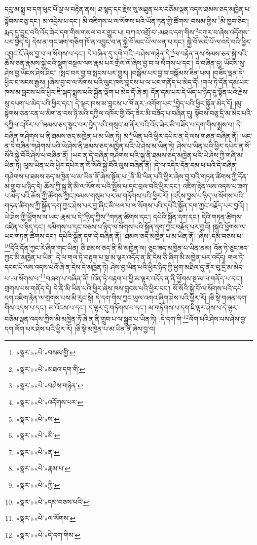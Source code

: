 དབུ་མ་སྨྲ་བ་དག་ཕུང་པོ་ལྔ་ལ་བརྟེན་ནས། ཐ་སྙད་དང་རྗེས་སུ་མཐུན་པར་བཅོམ་ལྡན་འདས་ཐམས་ཅད་མཁྱེན་པ་སྟོབས་བཅུ་དང་། མ་འདྲེས་པ་དང་། མི་འཇིགས་པ་ལ་སོགས་པའི་ཡོན་ཏན་གྱི་ཚོགས་:བསམ་གྱིས་\footnote{«སྣར་»«པེ་»བསམ་གྱི་}མི་ཁྱབ་ཅིང་། རྨད་དུ་བྱུང་བའི་འོད་ཟེར་དག་གིས་གསལ་བར་གྱུར་པ། བཀའ་འགྲོ་བ་:མཐའ་དག་གིས་\footnote{«སྣར་»«པེ་»མཐའ་དག་གི་}བཀུར་བ་ཞེས་འདོགས་པར་བྱེད་དེ། དེས་ན་གང་ཟག་གཅིག་ཁོ་ན་འབྱུང་བ་ན་སྐྱེ་བོ་མང་པོ་ལ་ཕན་པ་དང་། སྐྱེ་བོ་མང་པོ་ལ་བདེ་བའི་ཕྱིར་འབྱུང་ངོ་ཞེས་བྱ་བ་ལ་སོགས་པ་དང་། དེ་བཞིན་དུ་དགེ་བའི་:བཤེས་གཉེན་དེ་\footnote{«སྣར་»«པེ་»བཤེས་གཉེན་}ལ་བརྟེན་ནས་སེམས་ཅན་སྐྱེ་བའི་ཆོས་ཅན་རྣམས་སྐྱེ་བའི་སྡུག་བསྔལ་ལས་རྣམ་པར་གྲོལ་ལོ་ཞེས་བྱ་བ་ལ་སོགས་པ་དང་། དེ་བཞིན་དུ། ཡོངས་སུ་ཤེས་བྱ་ཡོངས་ཤེས་ཤིང་། །སྤང་བར་བྱ་བ་སྤངས་པར་གྱུར། །བསྒོམ་པར་བྱ་བ་བསྒོམས་ཟིན་པས། །བཟོད་ལྡན་དེ་ཕྱིར་ང་སངས་རྒྱས། །ཞེས་བྱ་བ་ལ་སོགས་པའི་ལུང་ཁས་བླངས་པ་ལ་ཡང་གནོད་པ་མེད་དོ། །གལ་ཏེ་དོན་དམ་པར་ཁས་མ་བླངས་པའི་ཕྱིར་ཇི་སྐད་སྨྲས་པའི་སྐྱོན་ལྡོག་པ་མེད་དོ་ཞེ་ན། དོན་དམ་པར་དེ་ཡོད་པ་ཉིད་དུ་སྟོན་པའི་རྗེས་སུ་དཔག་པ་མེད་པའི་ཕྱིར་དང་། དེ་ལྟར་ཁས་མ་བླངས་པ་ཁོ་ནར་:འགོག་པར་\footnote{«སྣར་»«པེ་»འདོགས་པར་}བྱེད་པའི་ཕྱིར་སྐྱོན་མེད་དོ། །མུ་སྟེགས་ཅན་ངན་པ་མིག་ན་བས་ཉི་མའི་དཀྱིལ་འཁོར་གྱི་འོད་ཟེར་མི་བཟོད་པ་བཞིན་དུ། སྟོབས་བཅུ་དྲི་མ་མེད་པའི་དཀྱིལ་འཁོར་པ་\footnote{«སྣར་»«པེ་»ས་}ཐམས་ཅད་སྣང་བར་བྱེད་པའི་གསུང་མ་ནོར་བའི་འོད་ཟེར་མི་བཟོད་པ་དག་གིས་སྨྲས་པ། དེ་བཞིན་གཤེགས་པ་ནི་ཐམས་ཅད་མཁྱེན་པ་མ་ཡིན་ཏེ། མ་\footnote{«སྣར་»«པེ་»མི་}ཡིན་པའི་ཕྱིར་དཔེར་ན་དེ་ལས་གཞན་བཞིན་ནོ། །ཡང་ན་དེ་བཞིན་གཤེགས་པའི་ཡེ་ཤེས་ནི་ཐམས་ཅད་མཁྱེན་པའི་ཡེ་ཤེས་མ་ཡིན་ཏེ། ཤེས་པ་ཡིན་པའི་ཕྱིར་དཔེར་ན་སོ་སོའི་སྐྱེ་བོའི་ཤེས་པ་བཞིན་ནོ། །ཡང་ན་དེ་བཞིན་གཤེགས་པའི་སྐུ་ནི་ཐམས་ཅད་མཁྱེན་པའི་ཡེ་ཤེས་ཀྱི་གཞི་མ་ཡིན་ཏེ། ལུས་ཡིན་པའི་ཕྱིར་དཔེར་ན་སོ་སོའི་སྐྱེ་བོའི་ལུས་བཞིན་ནོ། །དེ་ལ་འདིར་དོན་དམ་པ་པའི་དེ་བཞིན་གཤེགས་པ་ཐམས་ཅད་མཁྱེན་པ་མ་ཡིན་ནོ་ཞེས་སྟོན་པ་\footnote{«སྣར་»«པེ་»ན་}ནི་མི་ཡིན་པའི་ཕྱིར་ཞེས་བྱ་བའི་གཏན་ཚིགས་ཀྱི་དོན་མ་གྲུབ་པ་ཉིད་དེ། ཆོས་ཀྱི་སྐུ་ནི་མི་ལ་སོགས་པའི་སྤྲོས་པ་དང་བྲལ་བའི་ཕྱིར་དང་། འཇིག་རྟེན་ལས་འདས་པ་ཟག་པ་མེད་པའི་ཆོས་ཀྱི་ཚོགས་ཀྱང་ཁམས་གསུམ་པར་མ་གཏོགས་པའི་ཕྱིར་རོ། །འདིས་བྱས་པ་ཉིད་ལ་སོགས་པའི་གཏན་ཚིགས་ཀྱི་སྐྱོན་དག་ཀྱང་ཤེས་པར་བྱ་ཞིང་མི་ཕལ་པ་ལ་སོགས་པའི་དཔེའི་སྐྱོན་དག་ཀྱང་བརྗོད་པར་བྱའོ། །ཡེ་ཤེས་ཀྱི་ཕྱོགས་ལ་ཡང་:རྣམ་པ་དེ་\footnote{«སྣར་»«པེ་»རྣམ་པ་}ཉིད་ཀྱིས་\footnote{«སྣར་»«པེ་»ཀྱི་}གཏན་ཚིགས་དང་། དཔེའི་སྐྱོན་དག་དང་། དེའི་གཏན་ཚིགས་འཛིན་པ་ཉིད་དང་། དམིགས་པ་དང་བཅས་པ་ཉིད་ལ་སོགས་པའི་སྐྱོན་དག་ཀྱང་བརྗོད་པར་བྱའོ། །སྐུའི་ཕྱོགས་ལ་ཡང་གཏན་ཚིགས་དང་། དཔེའི་སྐྱོན་དག་དེ་བཞིན་ནོ། །ཐམས་ཅད་མཁྱེན་པ་མ་ཡིན་ནོ། །ཞེས་:དམ་བཅས་པ་\footnote{«སྣར་»«པེ་»དམ་བཅས་པའི་}དེའི་དོན་ཀྱང་རེ་ཞིག་གང་ཡིན། ཅི་ཐམས་ཅད་ནི་མི་མཁྱེན་ལ། ཅུང་ཟད་མཁྱེན་པ་ཡིན་ནམ། འོན་ཏེ་ཅུང་ཟད་ཀྱང་མི་མཁྱེན་པ་ཡིན། དེ་ལ་གལ་ཏེ་བརྟག་པ་སྔ་མ་ལྟར་འདོད་ན་ནི་དེས་ཅི་ཞིག་མི་མཁྱེན་པར་འདོད། གལ་ཏེ་དབང་པོ་ལས་འདས་པའོ་ཞེ་ན་དེས་དེ་མཁྱེན་ཏེ། ཤེས་བྱ་ཡིན་པའི་ཕྱིར་ཉིད་ཀྱི་ཕྱག་མཐིལ་དུ་ནོར་བུ་དྲི་མ་མེད་པ་:ལ་སོགས་པ་\footnote{«སྣར་»«པེ་»ལ་སོགས་}བཞག་པ་བཞིན་ནོ། །འོན་ཏེ་བརྟག་པ་ཕྱི་མ་ལྟར་འདོད་ན་ནི་ཕྱོགས་སྔ་མ་ལ་གནོད་པ་དང་། གྲགས་པས་གནོད་དེ། དེ་ནི་མི་ཡིན་པའི་ཕྱིར་ཞེས་ཁས་བླངས་པའི་ཕྱིར་དང་། སོ་སོའི་སྐྱེ་བོ་ལ་སོགས་པའི་དཔེ་དག་འཇིག་རྟེན་ལ་གྲགས་པས་མི་རུང་སྟེ། དེ་དག་གིས་ཀྱང་ཡུལ་འགའ་ཞིག་ཤེས་པའི་ཕྱིར་རོ། །ཅི་སྟེ་གཞན་དག་གིས་འདས་པ་དང་། མ་འོངས་པ་དང་། ད་ལྟར་དུ་གཏོགས་པ་དང་། མ་གཏོགས་པ་དག་ཇི་ལྟར་ཤེས་པ་དེ་ལྟར་བཅོམ་ལྡན་འདས་ཀྱིས་མི་མཁྱེན་ཏོ་ཞེ་ན་ནི་གྲུབ་པ་ལ་སྒྲུབ་པ་ཡིན་ཏེ། :དེ་དག་གི་\footnote{«སྣར་»«པེ་»དེ་དག་གིས་}ལོག་པའི་ཤེས་པས་ཤེས་བྱ་དག་ལོག་པར་ཤེས་པའི་ཕྱིར་རོ། །ཅི་སྟེ་མཁྱེན་པ་མ་ཡིན་ནོ་ཞེས་བྱ་བ། 